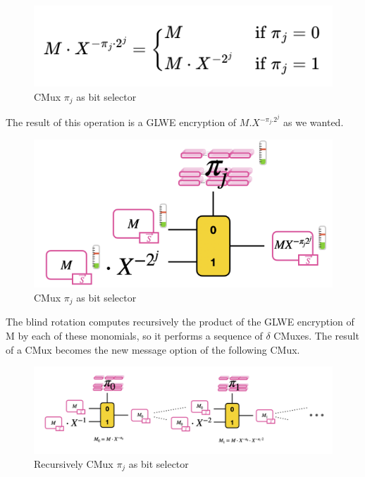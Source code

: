 \documentclass{techrep}
\theoremstyle{definition}
\theoremstyle{plain}
\begin{document}
	\begin{figure}[H]
		\centering
	\includegraphics[width=0.6\columnwidth]{fig/cmux_3.png}
		\caption{CMux $\pi_j$ as bit selector}
		\label{fig:cmux_3}
	\end{figure}

The result of this operation is a GLWE encryption of $M.X^{-\pi_j.2^j}$ as we wanted.

	\begin{figure}[H]
		\centering
	\includegraphics[width=0.6\columnwidth]{fig/cmux_4.png}
		\caption{CMux $\pi_j$ as bit selector}
		\label{fig:cmux_4}
	\end{figure}

The blind rotation computes recursively the product of the GLWE encryption of M by each of these monomials, so it performs a sequence of $\delta$ CMuxes. The result of a CMux becomes the new message option of the following CMux.


	\begin{figure}[H]
		\centering
	\includegraphics[width=0.8\columnwidth]{fig/cmux_5.png}
		\caption{Recursively CMux $\pi_j$ as bit selector}
		\label{fig:cmux_5}
	\end{figure}
\end{document}
